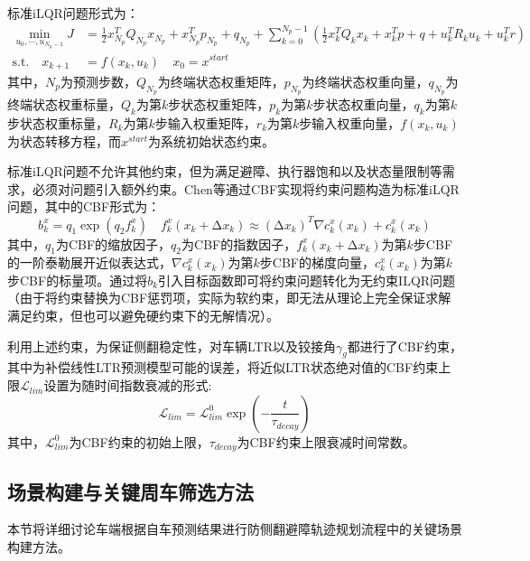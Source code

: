     标准iLQR问题形式为：
    \begin{equation}
      \begin{aligned}
      \min_{u_0,\cdots,u_{N_p-1}} J &= \frac{1}{2}x^T_{N_p}Q_{N_p}x_{N_p} + x^T_{N_p}p_{N_p} + q_{N_p} + \sum_{k=0}^{N_p-1} \left(\frac{1}{2}x^T_kQ_kx_k + x_k^Tp +q + u^T_k R_k u_k + u_k^Tr \right) \\
      \text{s.t.}\quad x_{k+1} &= f(x_k,u_k)\quad
      x_0 = x^{start}
      \end{aligned}
    \end{equation}
    \noindent 其中，$N_p$为预测步数，$Q_{N_p}$为终端状态权重矩阵，$p_{N_p}$为终端状态权重向量，$q_{N_p}$为终端状态权重标量，$Q_k$为第$k$步状态权重矩阵，$p_k$为第$k$步状态权重向量，$q_k$为第$k$步状态权重标量，$R_k$为第$k$步输入权重矩阵，$r_k$为第$k$步输入权重向量，$f(x_k,u_k)$为状态转移方程，而$x^{start}$为系统初始状态约束。

    标准iLQR问题不允许其他约束，但为满足避障、执行器饱和以及状态量限制等需求，必须对问题引入额外约束。Chen等\cite{chen2017CILQR_1,chen2019CILQR_2}通过CBF实现将约束问题构造为标准iLQR问题，其中的CBF形式为：
    \begin{equation}
      b_k^x=q_1 \exp(q_2 f_k^x)\quad f_k^x(x_k + \increment x_k)\approx (\increment x_k)^T\nabla c_k^x(x_k) + c_k^x(x_k)
    \end{equation}
    \noindent 其中，$q_1$为CBF的缩放因子，$q_2$为CBF的指数因子，$f_k^x(x_k + \increment x_k)$为第$k$步CBF的一阶泰勒展开近似表达式，$\nabla c_k^x(x_k)$为第$k$步CBF的梯度向量，$c_k^x(x_k)$为第$k$步CBF的标量项。通过将$b_k$引入目标函数即可将约束问题转化为无约束ILQR问题（由于将约束替换为CBF惩罚项，实际为软约束，即无法从理论上完全保证求解满足约束，但也可以避免硬约束下的无解情况）。

    利用上述约束，为保证侧翻稳定性，对车辆LTR以及铰接角$\gamma_{g}$都进行了CBF约束，其中为补偿线性LTR预测模型可能的误差，将近似LTR状态绝对值的CBF约束上限$\mathcal{L}_{lim}$设置为随时间指数衰减的形式:
    \begin{equation}
      \mathcal{L}_{lim} = \mathcal{L}_{lim}^0\exp(-\frac{t}{\tau_{decay}})
      \label{eq:ltr_cbf}
    \end{equation}
    \noindent 其中，$\mathcal{L}_{lim}^0$为CBF约束的初始上限，$\tau_{decay}$为CBF约束上限衰减时间常数。


  \subsection{场景构建与关键周车筛选方法}
    本节将详细讨论车端根据自车预测结果进行防侧翻避障轨迹规划流程中的关键场景构建方法。
    
